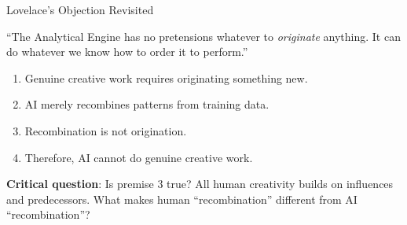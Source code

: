 ﻿\documentclass[aspectratio=169,11pt]{beamer}
\begin{document}
\begin{frame}{Lovelace's Objection Revisited}
\begin{quotebox}
\small
``The Analytical Engine has no pretensions whatever to \emph{originate} anything. It can do whatever we know how to order it to perform.''
\end{quotebox}

\vspace{0.2em}
\begin{probox}
\scriptsize
\begin{enumerate}
    \item Genuine creative work requires originating something new.
    \item AI merely recombines patterns from training data.
    \item Recombination is not origination.
    \item Therefore, AI cannot do genuine creative work.
\end{enumerate}
\end{probox}

\vspace{0.1em}
\textbf{Critical question}: Is premise 3 true? All human creativity builds on influences and predecessors. What makes human ``recombination'' different from AI ``recombination''?
\end{frame}
\end{document}
